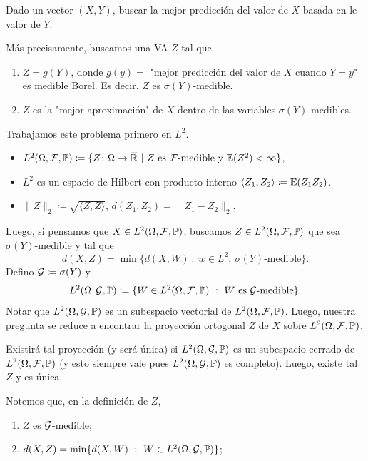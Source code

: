 \begin{problem}
	Dado un vector $(X,Y)$, buscar la mejor predicción del valor de $X$ basada en le valor de $Y$. \par
	Más precisamente, buscamos una VA $Z$ tal que
	\begin{enumerate}
		\item $Z = g(Y)$, donde $g(y) =$ "mejor predicción del valor de $X$ cuando $Y = y$" es medible Borel. Es decir, $Z$ es $\sigma(Y)$-medible.

		\item $Z$ es la "mejor aproximación" de $X$ dentro de las variables $\sigma(Y)$-medibles.
	\end{enumerate}
\end{problem}

Trabajamos este problema primero en $L^{2}$.
\begin{itemize}
	\item $L^{2}(\Omega, \mathcal{F}, \mathbb{P}) \coloneq \{Z \colon \Omega \to \overline{\mathbb{R}} \ | \ Z \text{ es } \mathcal{F} \text{-medible y } \mathbb{E}(Z^{2}) < \infty\}$,

	\item $L^{2}$ es un espacio de Hilbert con producto interno $\langle Z_{1},Z_{2} \rangle \coloneq \mathbb{E}(Z_{1} Z_{2})$.

	\item $\|Z\|_{2} \coloneq \sqrt{\langle Z, Z \rangle}$, $d(Z_{1},Z_{2}) = \| Z_{1} - Z_{2} \|_{2}$.
\end{itemize}
Luego, si pensamos que $X \in L^{2}(\Omega, \mathcal{F}, \mathbb{P})$, buscamos $Z \in L^{2}(\Omega, \mathcal{F}, \mathbb{P})$ que sea $\sigma(Y)$-medible y tal que
\[ d(X,Z) = \min \{d(X,W) \ : \ w \in L^{2},\ \sigma(Y)\text{-medible}\}. \]
Defino $\mathcal{G} \coloneq \sigma(Y)$ y 
\[ L^{2}(\Omega, \mathcal{G}, \mathbb{P}) \coloneq \{W \in L^{2}(\Omega, \mathcal{F}, \mathbb{P}) \ : \ W \text{ es } \mathcal{G} \text{-medible}\}. \]
Notar que $L^{2}(\Omega, \mathcal{G}, \mathbb{P})$ es un subespacio vectorial de $L^{2}(\Omega, \mathcal{F}, \mathbb{P})$. Luego, nuestra pregunta se reduce a encontrar la proyección ortogonal $Z$ de $X$ sobre $L^{2}(\Omega, \mathcal{F}, \mathbb{P})$. \par
Existirá tal proyección (y será única) si $L^{2}(\Omega, \mathcal{G}, \mathbb{P})$ es un subespacio cerrado de $L^{2}(\Omega, \mathcal{F}, \mathbb{P})$ (y esto siempre vale pues $L^{2}(\Omega, \mathcal{G}, \mathbb{P})$ es completo). Luego, existe tal $Z$ y es única. \par
Notemos que, en la definición de $Z$,
\begin{enumerate}
	\item[1)] $Z$ es $\mathcal{G}$-medible;

	\item[2)] $d(X,Z) = \min \{d(X,W) \ : \ W \in L^{2}(\Omega, \mathcal{G}, \mathbb{P})\}$;
\end{enumerate}
